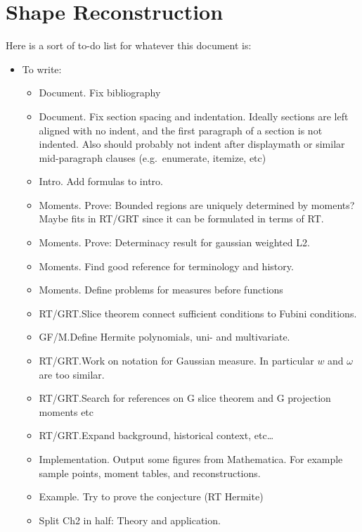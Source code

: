 


\section{Shape Reconstruction}
Here is a sort of to-do list for whatever this document is:
\begin{itemize}
    \item To write:
    \begin{itemize}
        \item Document. Fix bibliography
        \item Document. Fix section spacing and indentation. Ideally sections are left aligned with no indent, and the first paragraph of a section is not indented. Also should probably not indent after displaymath or similar mid-paragraph clauses (e.g.\ enumerate, itemize, etc)
        \item Intro. Add formulas to intro.
        \item Moments. Prove: Bounded regions are uniquely determined by moments? Maybe fits in RT/GRT since it can be formulated in terms of RT.\@
        \item Moments. Prove: Determinacy result for gaussian weighted L2.
        \item Moments. Find good reference for terminology and history. 
        \item Moments. Define problems for measures before functions
        \item RT/GRT.\@ Slice theorem connect sufficient conditions to Fubini conditions.
        \item GF/M.\@ Define Hermite polynomials, uni- and multivariate.
        \item RT/GRT.\@ Work on notation for Gaussian measure. In particular $w$ and $\omega$ are too similar. 
        \item RT/GRT.\@ Search for references on G slice theorem and G projection moments etc
        \item RT/GRT.\@ Expand background, historical context, etc\ldots
        \item Implementation. Output some figures from Mathematica. For example sample points, moment tables, and reconstructions.
        \item Example. Try to prove the conjecture (RT Hermite)
        \item Split Ch2 in half: Theory and application.
    \end{itemize}


\end{itemize}
